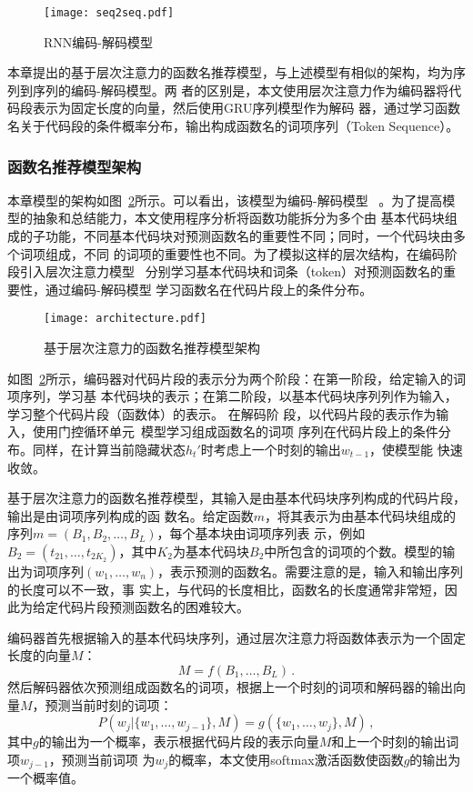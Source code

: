 \begin{figure} [!t]
	\centering
	\texttt{[image: seq2seq.pdf]}
	\caption{RNN编码-解码模型}
	\label{fig:seq2seq}
\end{figure}

本章提出的基于层次注意力的函数名推荐模型，与上述模型有相似的架构，均为序列到序列的编码-解码模型。两
者的区别是，本文使用层次注意力作为编码器将代码段表示为固定长度的向量，然后使用GRU序列模型作为解码
器，通过学习函数名关于代码段的条件概率分布，输出构成函数名的词项序列（Token Sequence）。

\subsubsection{函数名推荐模型架构}
本章模型的架构如图~\ref{fig:arch}所示。可以看出，该模型为编码-解码模型
~\cite{Kyunghyun2014Learning}。为了提高模型的抽象和总结能力，本文使用程序分析将函数功能拆分为多个由
基本代码块组成的子功能，不同基本代码块对预测函数名的重要性不同；同时，一个代码块由多个词项组成，不同
的词项的重要性也不同。为了模拟这样的层次结构，在编码阶段引入层次注意力模型
~\cite{yang2016hierarchical}分别学习基本代码块和词条（token）对预测函数名的重要性，通过编码-解码模型
学习函数名在代码片段上的条件分布。

\begin{figure} [!t]
	\centering
	\texttt{[image: architecture.pdf]}
	\caption{基于层次注意力的函数名推荐模型架构}
	\label{fig:arch}
\end{figure}

如图~\ref{fig:arch}所示，编码器对代码片段的表示分为两个阶段：在第一阶段，给定输入的词项序列，学习基
本代码块的表示；在第二阶段，以基本代码块序列列作为输入，学习整个代码片段（函数体）的表示。 在解码阶
段，以代码片段的表示作为输入，使用门控循环单元~\cite{Kyunghyun2014Learning}模型学习组成函数名的词项
序列在代码片段上的条件分布。同样，在计算当前隐藏状态$h_t'$时考虑上一个时刻的输出$w_{t-1}$，使模型能
快速收敛。

基于层次注意力的函数名推荐模型，其输入是由基本代码块序列构成的代码片段，输出是由词项序列构成的函
数名。给定函数$m$，将其表示为由基本代码块组成的序列$m=(B_1,B_2, \dots, B_L)$，每个基本块由词项序列表
示，例如$B_2 = (t_{21}, \dots, t_{2K_2})$，其中$K_2$为基本代码块$B_2$中所包含的词项的个数。模型的输
出为词项序列$(w_1, \dots, w_n)$，表示预测的函数名。需要注意的是，输入和输出序列的长度可以不一致，事
实上，与代码的长度相比，函数名的长度通常非常短，因此为给定代码片段预测函数名的困难较大。

编码器首先根据输入的基本代码块序列，通过层次注意力将函数体表示为一个固定长度的向量$M$：
\begin{equation}
M = f({B_1, \dots, B_L}) \,.
\label{eq:encoder}
\end{equation}
然后解码器依次预测组成函数名的词项，根据上一个时刻的词项和解码器的输出向量$M$，预测当前时刻的词项：
\begin{equation}
P(w_j|\{w_1, \dots, w_{j-1}\}, M) = g(\{w_1, \dots, w_{j}\}, M) \,,
\label{eq:decoder}
\end{equation}
其中$g$的输出为一个概率，表示根据代码片段的表示向量$M$和上一个时刻的输出词项$w_{j-1}$，预测当前词项
为$w_j$的概率，本文使用softmax激活函数使函数$g$的输出为一个概率值。

